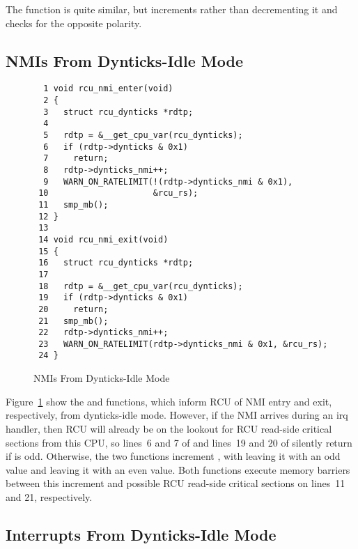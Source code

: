 The  function is quite similar, but increments
 rather than decrementing it and checks for
the opposite  polarity.

\subsection{NMIs From Dynticks-Idle Mode}
\label{app:formal:NMIs From Dynticks-Idle Mode}

\begin{figure}[tbp]
{ \scriptsize
\begin{verbatim}
  1 void rcu_nmi_enter(void)
  2 {
  3   struct rcu_dynticks *rdtp;
  4
  5   rdtp = &__get_cpu_var(rcu_dynticks);
  6   if (rdtp->dynticks & 0x1)
  7     return;
  8   rdtp->dynticks_nmi++;
  9   WARN_ON_RATELIMIT(!(rdtp->dynticks_nmi & 0x1),
 10                     &rcu_rs);
 11   smp_mb();
 12 }
 13
 14 void rcu_nmi_exit(void)
 15 {
 16   struct rcu_dynticks *rdtp;
 17
 18   rdtp = &__get_cpu_var(rcu_dynticks);
 19   if (rdtp->dynticks & 0x1)
 20     return;
 21   smp_mb();
 22   rdtp->dynticks_nmi++;
 23   WARN_ON_RATELIMIT(rdtp->dynticks_nmi & 0x1, &rcu_rs);
 24 }
\end{verbatim}
}
\caption{NMIs From Dynticks-Idle Mode}
\label{fig:app:formal:NMIs From Dynticks-Idle Mode}
\end{figure}

Figure~\ref{fig:app:formal:NMIs From Dynticks-Idle Mode}
show the  and  functions,
which inform RCU of NMI entry and exit, respectively, from dynticks-idle
mode.
However, if the NMI arrives during an irq handler, then RCU will already
be on the lookout for RCU read-side critical sections from this CPU,
so lines~6 and 7 of  and lines~19 and 20
of  silently return if  is odd.
Otherwise, the two functions increment , with
 leaving it with an odd value and 
leaving it with an even value.
Both functions execute memory barriers between this increment
and possible RCU read-side critical sections on lines~11 and 21,
respectively.

\subsection{Interrupts From Dynticks-Idle Mode}
\label{app:formal:Interrupts From Dynticks-Idle Mode}


